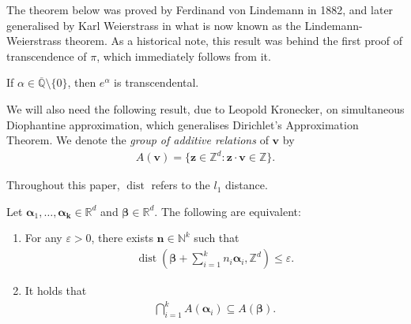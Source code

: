 
The theorem below was proved by Ferdinand von Lindemann in 1882, and later generalised by Karl Weierstrass in what is now known as the Lindemann-Weierstrass theorem. As a historical note, this result was behind the first proof of transcendence of $\pi$, which immediately follows from it.

\begin{theorem}[Lindemann]
If $\alpha \in \overline{\mathbb{Q}} \setminus \lbrace 0 \rbrace$, then $e^{\alpha}$ is transcendental.
\end{theorem}

We will also need the following result, due to Leopold Kronecker, on simultaneous Diophantine approximation, which generalises Dirichlet's Approximation Theorem. We denote the \emph{group of additive relations} of $\boldsymbol{v}$ by
\begin{align*}
A(\boldsymbol{v}) = \lbrace \boldsymbol{z} \in \mathbb{Z}^{d} : \boldsymbol{z} \cdot \boldsymbol{v} \in \mathbb{Z} \rbrace .
\end{align*}

Throughout this paper, $\operatorname{dist}$ refers to the $l_{1}$ distance.

\begin{theorem}[Kronecker]
\label{Kronecker}
Let $\boldsymbol{\alpha}_{1}, \ldots, \boldsymbol{\alpha_{k}} \in \mathbb{R}^{d}$ and $\boldsymbol{\beta} \in \mathbb{R}^{d}$. The following are equivalent:
\begin{enumerate}
\item For any $\varepsilon > 0$, there exists $\boldsymbol{n} \in \mathbb{N}^{k}$ such that
\begin{align*}
\operatorname{dist}(\boldsymbol{\beta} + \sum\limits_{i=1}^{k} n_{i} \boldsymbol{\alpha}_{i}, \mathbb{Z}^{d}) \leq \varepsilon .
\end{align*}
\item It holds that
\begin{align*}
\bigcap\limits_{i=1}^{k} A(\boldsymbol{\alpha}_{i}) \subseteq A(\boldsymbol{\beta}) .
\end{align*}
\end{enumerate}
\end{theorem}

